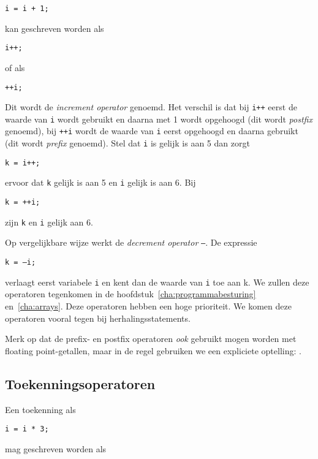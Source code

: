 \hspace*{1em}\texttt{i = i + 1;}

kan geschreven worden als

\hspace*{1em}\texttt{i++;}

of als 

\hspace*{1em}\texttt{++i;}

Dit wordt de \textsl{increment operator}\indexop{++} genoemd. Het verschil is dat bij \texttt{i++} eerst de waarde van \texttt{i} wordt gebruikt en daarna met 1 wordt opgehoogd (dit wordt \textsl{postfix} genoemd), bij \texttt{++i} wordt de waarde van \texttt{i} eerst opgehoogd en daarna gebruikt (dit wordt \textsl{prefix} genoemd). Stel dat \texttt{i} is gelijk is aan 5 dan zorgt

\hspace*{1em}\texttt{k = i++;}

ervoor dat \texttt{k} gelijk is aan 5 en \texttt{i} gelijk is aan 6. Bij

\hspace*{1em}\texttt{k = ++i;}

zijn \texttt{k} en \texttt{i} gelijk aan 6.

Op vergelijkbare wijze werkt de \textsl{decrement operator} \texttt{--}\indexop{--}. De expressie

\hspace*{1em}\texttt{k = --i;}

verlaagt eerst variabele \texttt{i} en kent dan de waarde van \texttt{i} toe aan k. We zullen deze operatoren tegenkomen in de hoofdstuk~\ref{cha:programmabesturing} en~\ref{cha:arrays}. Deze operatoren hebben een hoge prioriteit. We komen deze operatoren vooral tegen bij herhalingsstatements.

Merk op dat de prefix- en postfix operatoren \textsl{ook} gebruikt mogen worden met floating point-getallen, maar in de regel gebruiken we een expliciete optelling: .

\subsection{Toekenningsoperatoren}
Een toekenning als

\hspace*{1em}\texttt{i = i * 3;}

mag geschreven worden als

